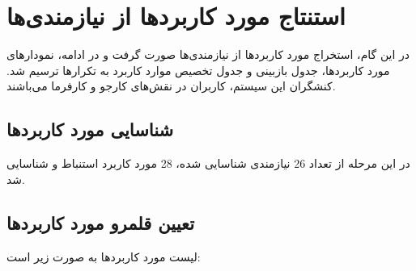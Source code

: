 \chapter{استنتاج مورد کاربرد‌ها از نیازمندی‌‌ها}		
در این گام، استخراج مورد کاربرد‌ها از نیازمندی‌ها صورت گرفت و در ادامه، نمودار‌‌های مورد کاربرد‌ها، جدول بازبینی و جدول تخصیص موارد کاربرد به تکرار‌‌ها ترسیم شد. کنشگران این سیستم، کاربران در نقش‌های کارجو و کارفرما می‌باشند.

\section{شناسایی مورد کاربرد‌ها}		
در این مرحله از تعداد 26 نیازمندی شناسایی شده، 28 مورد کاربرد استنباط و شناسایی شد.

\section{تعیین قلمرو مورد کاربرد‌ها}		
لیست مورد کاربرد‌ها به صورت زیر است:
